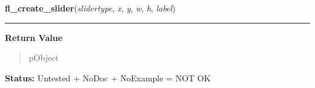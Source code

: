     \label{xformslib:library:fl_create_slider}

    \vspace{0.5ex}

\hspace{.8\funcindent}\begin{boxedminipage}{\funcwidth}

    \raggedright \textbf{fl\_create\_slider}(\textit{slidertype}, \textit{x}, \textit{y}, \textit{w}, \textit{h}, \textit{label})

    \vspace{-1.5ex}

    \rule{\textwidth}{0.5\fboxrule}
\setlength{\parskip}{2ex}
\setlength{\parskip}{1ex}
      \textbf{Return Value}
    \vspace{-1ex}

      \begin{quote}
      pObject

      \end{quote}

\textbf{Status:} Untested + NoDoc + NoExample = NOT OK



    \end{boxedminipage}

    \label{xformslib:library:fl_add_slider}

    \vspace{0.5ex}

